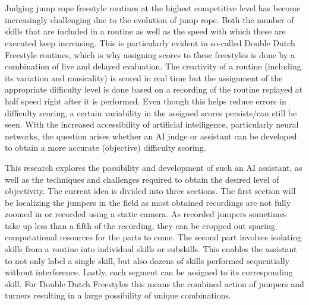 
\chapter*{}

Judging jump rope freestyle routines at the highest competitive level has become increasingly challenging due to the evolution of jump rope. Both the number of skills that are included in a routine as well as the speed with which these are executed keep increasing. This is particularly evident in so-called Double Dutch Freestyle routines, which is why assigning scores to these freestyles is done by a combination of live and delayed evaluation. The creativity of a routine (including its variation and musicality) is scored in real time but the assignment of the appropriate difficulty level is done based on a recording of the routine replayed at half speed right after it is performed. Even though this helps reduce errors in difficulty scoring, a certain variability in the assigned scores persists/can still be seen. With the increased accessibility of artificial intelligence, particularly neural networks, the question arises whether an AI judge or assistant can be developed to obtain a more accurate (objective) difficulty scoring.

This research explores the possibility and development of such an AI assistant, as well as the techniques and challenges required to obtain the desired level of objectivity.
The current idea is divided into three sections. The first section will be localizing the jumpers in the field as most obtained recordings are not fully zoomed in or recorded using a static camera. As recorded jumpers sometimes take up less than a fifth of the recording, they can be cropped out sparing computational resources for the parts to come. The second part involves isolating skills from a routine into individual skills or subskills. This enables the assistant to not only label a single skill, but also dozens of skills performed sequentially without interference. Lastly, each segment can be assigned to its corresponding skill. For Double Dutch Freestyles this means the combined action of jumpers and turners resulting in a large possibility of unique combinations.

